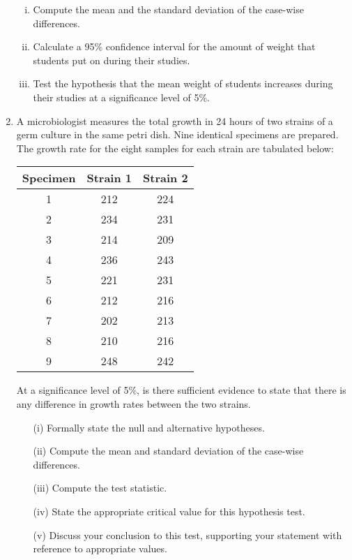 \documentclass[]{article}
\begin{document}
\begin{enumerate}
\begin{enumerate}[(i)]
\item Compute the mean and the standard deviation of the case-wise differences.
	\item  Calculate a 95\% confidence interval for the amount of weight that students put on during their studies. 
	\item   Test the hypothesis that the mean weight of students increases during their studies at a significance level of  5\%. 
\end{enumerate}


\item A microbiologist measures the total growth in 24 hours of two strains of a germ culture  in the same petri dish. Nine identical specimens are prepared. The growth rate for the eight samples for each strain are tabulated below:

\begin{center}
	\begin{tabular}{|c|c|c|} \hline 
		Specimen &	Strain 1	&	Strain 2	\\ \hline \hline
		1 & 212 & 224 \\ \hline
		2 & 234 & 231 \\ \hline
		3 & 214 & 209 \\ \hline
		4 & 236 & 243 \\ \hline
		5 & 221 & 231 \\ \hline 
		6 & 212 & 216 \\ \hline
		7 & 202 & 213 \\ \hline 
		8 & 210 & 216 \\ \hline
		9 & 248 & 242 \\ \hline
	\end{tabular} 
\end{center}
\noindent At a significance level of 5\%, is there sufficient evidence to state that there is any difference in growth rates between the two strains.




\begin{itemize}
	\item[(i)] Formally state the null and alternative hypotheses.
	\item[(ii)]  Compute the mean and standard deviation of the case-wise differences.
	\item[(iii)] Compute the test statistic.
	\item[(iv)] State the appropriate critical value for this hypothesis test.
	\item[(v)] Discuss your conclusion to this test, supporting your statement with reference to appropriate values.
\end{itemize}




\end{enumerate}
\end{document}
